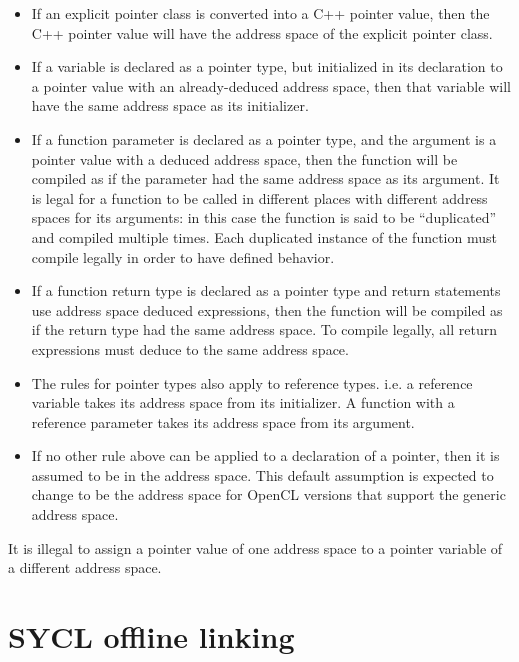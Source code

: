 \begin{itemize}
\item If an explicit pointer class is converted into a C++ pointer value, then
 the C++ pointer value will have the address space of the explicit pointer
 class.
\item If a variable is declared as a pointer type, but initialized in its
 declaration to a pointer value with an already-deduced address space, then that
 variable will have the same address space as its initializer.
\item If a function parameter is declared as a pointer type, and the argument is
 a pointer value with a deduced address space, then the function will be
 compiled as if the parameter had the same address space as its argument. It is
 legal for a function to be called in different places with different address
 spaces for its arguments: in this case the function is said to be
 ``duplicated'' and compiled multiple times. Each duplicated instance of the
 function must compile legally in order to have defined behavior.
\item If a function return type is declared as a pointer type and return statements use
 address space deduced expressions, then the function will be compiled as if the return type
 had the same address space. To compile legally, all return expressions must deduce to the same
 address space.
\item The rules for pointer types also apply to reference types. i.e. a
 reference variable takes its address space from its initializer. A function
 with a reference parameter takes its address space from its argument.
\item If no other rule above can be applied to a declaration of a pointer, then
 it is assumed to be in the  address space. This default assumption
 is expected to change to be the  address space for OpenCL
 versions that support the generic address space.
\end{itemize}

It is illegal to assign a pointer value of one address space to a pointer
variable of a different address space.

\section{SYCL offline linking}
